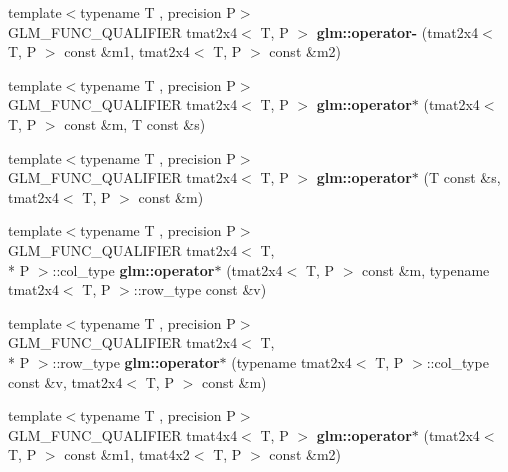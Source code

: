 \begin{DoxyCompactItemize}
\item 
\hypertarget{namespaceglm_ab0e4ee4a08d22d35213dd50729bbfd3c}{{\footnotesize template$<$typename T , precision P$>$ }\\G\-L\-M\-\_\-\-F\-U\-N\-C\-\_\-\-Q\-U\-A\-L\-I\-F\-I\-E\-R tmat2x4$<$ T, P $>$ {\bfseries glm\-::operator-\/} (tmat2x4$<$ T, P $>$ const \&m1, tmat2x4$<$ T, P $>$ const \&m2)}\label{namespaceglm_ab0e4ee4a08d22d35213dd50729bbfd3c}

\item 
\hypertarget{namespaceglm_a75b1d4aef24642cfdfa64e5ab6750ecb}{{\footnotesize template$<$typename T , precision P$>$ }\\G\-L\-M\-\_\-\-F\-U\-N\-C\-\_\-\-Q\-U\-A\-L\-I\-F\-I\-E\-R tmat2x4$<$ T, P $>$ {\bfseries glm\-::operator$\ast$} (tmat2x4$<$ T, P $>$ const \&m, T const \&s)}\label{namespaceglm_a75b1d4aef24642cfdfa64e5ab6750ecb}

\item 
\hypertarget{namespaceglm_a7606b6ba88f55e504bf9d560a88e0d62}{{\footnotesize template$<$typename T , precision P$>$ }\\G\-L\-M\-\_\-\-F\-U\-N\-C\-\_\-\-Q\-U\-A\-L\-I\-F\-I\-E\-R tmat2x4$<$ T, P $>$ {\bfseries glm\-::operator$\ast$} (T const \&s, tmat2x4$<$ T, P $>$ const \&m)}\label{namespaceglm_a7606b6ba88f55e504bf9d560a88e0d62}

\item 
\hypertarget{namespaceglm_a3772f89585867565204253e3565e37cc}{{\footnotesize template$<$typename T , precision P$>$ }\\G\-L\-M\-\_\-\-F\-U\-N\-C\-\_\-\-Q\-U\-A\-L\-I\-F\-I\-E\-R tmat2x4$<$ T, \\*
P $>$\-::col\-\_\-type {\bfseries glm\-::operator$\ast$} (tmat2x4$<$ T, P $>$ const \&m, typename tmat2x4$<$ T, P $>$\-::row\-\_\-type const \&v)}\label{namespaceglm_a3772f89585867565204253e3565e37cc}

\item 
\hypertarget{namespaceglm_ad617e550b85d998ff5a8e28b251f1576}{{\footnotesize template$<$typename T , precision P$>$ }\\G\-L\-M\-\_\-\-F\-U\-N\-C\-\_\-\-Q\-U\-A\-L\-I\-F\-I\-E\-R tmat2x4$<$ T, \\*
P $>$\-::row\-\_\-type {\bfseries glm\-::operator$\ast$} (typename tmat2x4$<$ T, P $>$\-::col\-\_\-type const \&v, tmat2x4$<$ T, P $>$ const \&m)}\label{namespaceglm_ad617e550b85d998ff5a8e28b251f1576}

\item 
\hypertarget{namespaceglm_a4e69ab15c960142f85239bf176d0f033}{{\footnotesize template$<$typename T , precision P$>$ }\\G\-L\-M\-\_\-\-F\-U\-N\-C\-\_\-\-Q\-U\-A\-L\-I\-F\-I\-E\-R tmat4x4$<$ T, P $>$ {\bfseries glm\-::operator$\ast$} (tmat2x4$<$ T, P $>$ const \&m1, tmat4x2$<$ T, P $>$ const \&m2)}\label{namespaceglm_a4e69ab15c960142f85239bf176d0f033}


\end{DoxyCompactItemize}
